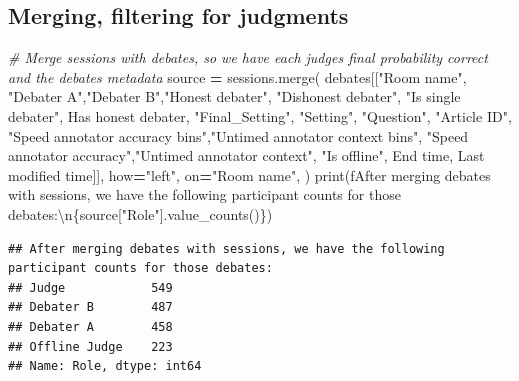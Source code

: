 \documentclass[
]{article}
\newenvironment{Shaded}{\begin{snugshade}}{\end{snugshade}}
\newcommand{\BuiltInTok}[1]{#1}
\newcommand{\CharTok}[1]{\textcolor[rgb]{0.31,0.60,0.02}{#1}}
\newcommand{\CommentTok}[1]{\textcolor[rgb]{0.56,0.35,0.01}{\textit{#1}}}
\newcommand{\NormalTok}[1]{#1}
\newcommand{\OperatorTok}[1]{\textcolor[rgb]{0.81,0.36,0.00}{\textbf{#1}}}
\newcommand{\SpecialCharTok}[1]{\textcolor[rgb]{0.00,0.00,0.00}{#1}}
\newcommand{\SpecialStringTok}[1]{\textcolor[rgb]{0.31,0.60,0.02}{#1}}
\newcommand{\StringTok}[1]{\textcolor[rgb]{0.31,0.60,0.02}{#1}}
\begin{document}
\hypertarget{merging-filtering-for-judgments}{%
\subsection{Merging, filtering for
judgments}\label{merging-filtering-for-judgments}}

\begin{Shaded}
\begin{Highlighting}[]
\CommentTok{\# Merge sessions with debates, so we have each judge\textquotesingle{}s final probability correct and the debate\textquotesingle{}s metadata}
\NormalTok{source }\OperatorTok{=}\NormalTok{ sessions.merge(}
\NormalTok{        debates[[}\StringTok{"Room name"}\NormalTok{, }\StringTok{"Debater A"}\NormalTok{,}\StringTok{"Debater B"}\NormalTok{,}\StringTok{"Honest debater"}\NormalTok{, }\StringTok{"Dishonest debater"}\NormalTok{,}
                 \StringTok{"Is single debater"}\NormalTok{, }\StringTok{\textquotesingle{}Has honest debater\textquotesingle{}}\NormalTok{,}
                 \StringTok{"Final\_Setting"}\NormalTok{, }\StringTok{"Setting"}\NormalTok{,}
                 \StringTok{"Question"}\NormalTok{, }\StringTok{"Article ID"}\NormalTok{,}
                 \StringTok{"Speed annotator accuracy bins"}\NormalTok{,}\StringTok{"Untimed annotator context bins"}\NormalTok{,}
                 \StringTok{"Speed annotator accuracy"}\NormalTok{,}\StringTok{"Untimed annotator context"}\NormalTok{, }\StringTok{"Is offline"}\NormalTok{,}
                 \StringTok{\textquotesingle{}End time\textquotesingle{}}\NormalTok{, }\StringTok{\textquotesingle{}Last modified time\textquotesingle{}}\NormalTok{]],}
\NormalTok{        how}\OperatorTok{=}\StringTok{"left"}\NormalTok{,}
\NormalTok{        on}\OperatorTok{=}\StringTok{"Room name"}\NormalTok{,}
\NormalTok{    )}
\BuiltInTok{print}\NormalTok{(}\SpecialStringTok{f\textquotesingle{}After merging debates with sessions, we have the following participant counts for those debates:}\CharTok{\textbackslash{}n}\SpecialCharTok{\{}\NormalTok{source[}\StringTok{"Role"}\NormalTok{]}\SpecialCharTok{.}\NormalTok{value\_counts()}\SpecialCharTok{\}}\SpecialStringTok{\textquotesingle{}}\NormalTok{) }
\end{Highlighting}
\end{Shaded}

\begin{verbatim}
## After merging debates with sessions, we have the following participant counts for those debates:
## Judge            549
## Debater B        487
## Debater A        458
## Offline Judge    223
## Name: Role, dtype: int64
\end{verbatim}
\end{document}

